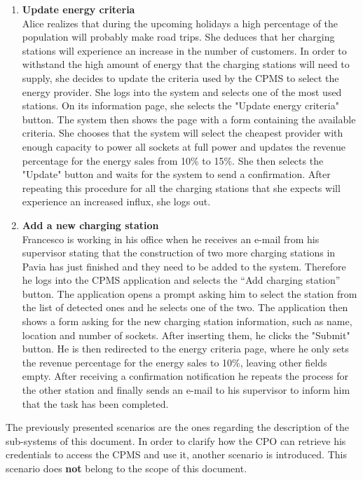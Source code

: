 \begin{enumerate}
\item \textbf{Update energy criteria}\\
Alice realizes that during the upcoming holidays a high percentage of the population will probably make road trips. She deduces that her charging stations will experience an increase in the number of customers. In order to withstand the high amount of energy that the charging stations will need to supply, she decides to update the criteria used by the CPMS to select the energy provider. She logs into the system and selects one of the most used stations. On its information page, she selects the "Update energy criteria" button. The system then shows the page with a form containing the available criteria. She chooses that the system will select the cheapest provider with enough capacity to power all sockets at full power and updates the revenue percentage for the energy sales from 10\% to 15\%. She then selects the "Update" button and waits for the system to send a confirmation. After repeating this procedure for all the charging stations that she expects will experience an increased influx, she logs out.
\item \textbf{Add a new charging station}\\
Francesco is working in his office when he receives an e-mail from his supervisor stating that the construction of two more charging stations in Pavia has just finished and they need to be added to the system. Therefore he logs into the CPMS application and selects the “Add charging station” button. The application opens a prompt asking him to select the station from the list of detected ones and he selects one of the two. The application then shows a form asking for the new charging station information, such as name, location and number of sockets. After inserting them, he clicks the "Submit" button. He is then redirected to the energy criteria page, where he only sets the revenue percentage for the energy sales to 10\%, leaving other fields empty. After receiving a confirmation notification he repeats the process for the other station and finally sends an e-mail to his supervisor to inform him that the task has been completed.

\end{enumerate}
The previously presented scenarios are the ones regarding the description of the sub-systems of this document. In order to clarify how the CPO can retrieve his credentials to access the CPMS and use it, another scenario is introduced. This scenario does \textbf{not} belong to the scope of this document.
